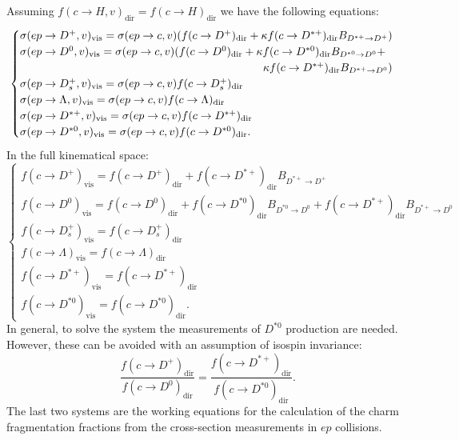 \begin{appendices}
Assuming  $f(c \rightarrow H, v)_{\text{dir}}=f(c 
\rightarrow H)_{\text{dir}}$ we have the following equations:
$$
\begin{cases}
\sigma(ep\rightarrow D^+, v)_{\text{vis}}      
 =\sigma(ep\rightarrow c, v)
(f(c \rightarrow  D^+)_{\text{dir}}+ 
\kappa f(c \rightarrow   D^{*+})_{\text{dir}}
B_{D^{*+} \rightarrow D^+})\\
\sigma(ep\rightarrow D^0, v)_{\text{vis}}       
=\sigma(ep\rightarrow c, v)
(f(c \rightarrow   D^0)_{\text{dir}}+
\kappa f(c \rightarrow   D^{*0})_{\text{dir}}
B_{D^{*0} \rightarrow D^0}+\\
\hfill\kappa f(c \rightarrow  
D^{*+})_{\text{dir}}B_{D^{*+} \rightarrow D^0})\\
\sigma(ep\rightarrow D^+_s, v)_{\text{vis}}     
=\sigma(ep\rightarrow c, v)
f(c \rightarrow   D^+_s)_{\text{dir}}\\
\sigma(ep\rightarrow \Lambda, v)_{\text{vis}}   
=\sigma(ep\rightarrow c, v)
f(c \rightarrow   \Lambda)_{\text{dir}}\\
\sigma(ep\rightarrow D^{*+}, v)_{\text{vis}}      
 =\sigma(ep\rightarrow c, v)
f(c \rightarrow   D^{*+})_{\text{dir}}\\
\sigma(ep\rightarrow D^{*0}, v)_{\text{vis}}       
=\sigma(ep\rightarrow c, v)
f(c \rightarrow   D^{*0})_{\text{dir}}.
\end{cases}
$$
In the full kinematical space:
$$
\begin{cases}
f(c \rightarrow  D^+)_{\text{vis}}       
= f(c \rightarrow  D^+)_{\text{dir}}          
+ f(c \rightarrow   D^{*+})_{\text{dir}}B_{D^{*+} \rightarrow D^+}\\
f(c \rightarrow  D^0)_{\text{vis}}       
= f(c \rightarrow   D^0)_{\text{dir}}          
+ f(c \rightarrow   D^{*0})_{\text{dir}} B_{D^{*0} \rightarrow D^0}+ 
f(c \rightarrow   D^{*+})_{\text{dir}}B_{D^{*+} \rightarrow D^0}\\
f(c \rightarrow  D^+_s)_{\text{vis}}     
=f(c \rightarrow   D^+_s)_{\text{dir}}\\
f(c \rightarrow  \Lambda)_{\text{vis}}   
=f(c \rightarrow   \Lambda)_{\text{dir}}\\
f(c \rightarrow  D^{*+})_{\text{vis}}       
=f(c \rightarrow   D^{*+})_{\text{dir}}\\
f(c \rightarrow  D^{*0})_{\text{vis}}       
=f(c \rightarrow   D^{*0})_{\text{dir}}.
\end{cases}
$$
In general, to solve the system the measurements of $D^{*0}$ production 
are needed. However, these can be avoided with an assumption of isospin 
invariance:$$\frac{f(c\rightarrow D^+)_{\text{dir}}}
{f(c\rightarrow D^0)_{\text{dir}}}
=\frac{f(c\rightarrow D^{*+})_{\text{dir}}}{f(c\rightarrow 
D^{*0})_{\text{dir}}}.$$
The last two systems are the working equations for the calculation of 
the  charm fragmentation fractions from the cross-section measurements 
in $ep$ collisions.
\end{appendices}
